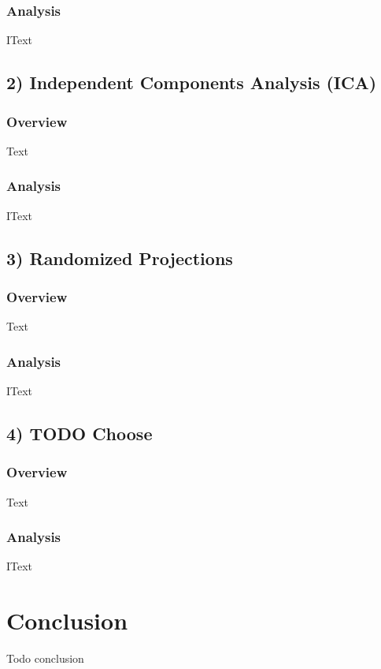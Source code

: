 \documentclass[h]{article}
\begin{document}
\subsubsection*{Analysis}
IText

\subsection*{2) Independent Components Analysis (ICA)}  
\subsubsection*{Overview}
Text

\subsubsection*{Analysis}
IText

\subsection*{3) Randomized Projections}  
\subsubsection*{Overview}
Text

\subsubsection*{Analysis}
IText

\subsection*{4) TODO Choose}  
\subsubsection*{Overview}
Text

\subsubsection*{Analysis}
IText


\section*{Conclusion}  
Todo conclusion
\end{document}
